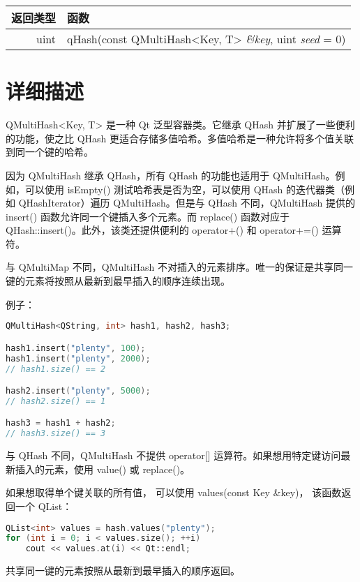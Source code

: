 \begin{longtable}[l]{|r|l|}   
    \hline
    返回类型 	& 函数 \\
    \hline
    uint &	qHash(const QMultiHash<Key, T> \emph{\&key}, uint \emph{seed} = 0) \\ 
    \hline
\end{longtable}

\section{详细描述}

QMultiHash<Key, T> 是一种 Qt 泛型容器类。它继承 QHash 并扩展了一些便利的功能，使之比 QHash 更适合存储多值哈希。多值哈希是一种允许将多个值关联到同一个键的哈希。

因为 QMultiHash 继承 QHash，所有 QHash 的功能也适用于 QMultiHash。例如，可以使用 isEmpty() 测试哈希表是否为空，可以使用 QHash 的迭代器类（例如 QHashIterator）遍历 QMultiHash。但是与 QHash 不同，QMultiHash 提供的 insert() 函数允许同一个键插入多个元素。而 replace() 函数对应于 QHash::insert()。此外，该类还提供便利的 operator+() 和 operator+=() 运算符。

与 QMultiMap 不同，QMultiHash 不对插入的元素排序。唯一的保证是共享同一键的元素将按照从最新到最早插入的顺序连续出现。

例子：

\begin{lstlisting}[language=C++]
QMultiHash<QString, int> hash1, hash2, hash3;

hash1.insert("plenty", 100);
hash1.insert("plenty", 2000);
// hash1.size() == 2

hash2.insert("plenty", 5000);
// hash2.size() == 1

hash3 = hash1 + hash2;
// hash3.size() == 3
\end{lstlisting}


与 QHash 不同，QMultiHash 不提供 operator[] 运算符。如果想用特定键访问最新插入的元素，使用 value() 或 replace()。

如果想取得单个键关联的所有值，
可以使用 values(const Key \&key)，
该函数返回一个 QList：

\begin{lstlisting}[language=C++]
QList<int> values = hash.values("plenty");
for (int i = 0; i < values.size(); ++i)
    cout << values.at(i) << Qt::endl;
\end{lstlisting}

共享同一键的元素按照从最新到最早插入的顺序返回。

